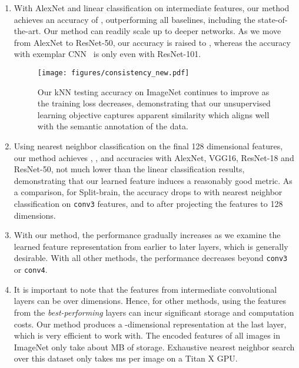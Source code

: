 \vspace{-7pt}
\begin{enumerate}[leftmargin=*,labelindent=0pt,itemsep=0pt]
\item With AlexNet and linear classification on intermediate features,
our method achieves an accuracy of ,
outperforming all baselines, including the state-of-the-art.
Our method can readily scale up to deeper networks. As we move from
AlexNet to ResNet-50, our accuracy is raised to ,
whereas the accuracy with
exemplar CNN~\cite{doersch2017multi} 
is only  even with ResNet-101.

\begin{figure}[t]
	\centering
	\texttt{[image: figures/consistency\_new.pdf]}
	\caption{\small
		Our kNN testing accuracy on ImageNet continues to improve as the training loss decreases, demonstrating 
		that our unsupervised learning objective captures apparent similarity which aligns well with the semantic annotation of the data.
	}
	\label{fig:consistency}
\vspace{-6pt}
\end{figure}

\item Using nearest neighbor classification on the final 128 dimensional features, our method achieves , ,  and  accuracies
with AlexNet, VGG16, ResNet-18 and ResNet-50,
not much lower than the linear classification results, demonstrating that our learned feature induces a reasonably good metric.
As a comparison, for Split-brain, the accuracy drops to  with nearest neighbor classification on \texttt{conv3} features,
and to  after projecting the features to 128 dimensions.

\item With our method, the performance gradually increases
as we examine the learned feature representation from earlier to later layers, which is generally desirable.
With all other methods,
the performance decreases beyond \texttt{conv3} or \texttt{conv4}.

\item It is important to note that the features from
intermediate convolutional layers can be over  dimensions.
Hence, for other methods, using the features from the \emph{best-performing}
layers can incur significant storage and computation costs.
Our method produces a -dimensional representation at the last layer,
which is very efficient to work with. The encoded features of all 
images in ImageNet only take about  MB of storage.
Exhaustive nearest neighbor search over this dataset only takes  ms per image on a Titan X GPU.
\end{enumerate}

